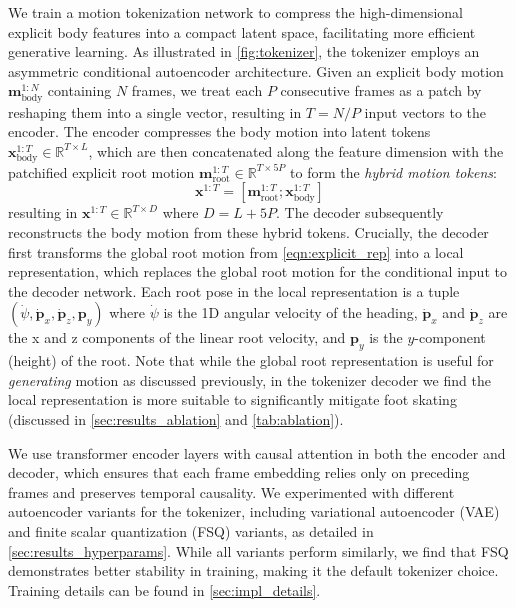 We train a motion tokenization network to compress the high-dimensional explicit body features into a compact latent space, facilitating more efficient generative learning.
As illustrated in \cref{fig:tokenizer}, the tokenizer employs an asymmetric conditional autoencoder architecture.
Given an explicit body motion $\mathbf{m}_\text{body}^{1:N}$ containing $N$ frames, we treat each $P$ consecutive frames as a patch by reshaping them into a single vector, resulting in $T=N/P$ input vectors to the encoder.
The encoder compresses the body motion into latent tokens $\mathbf{x}_\text{body}^{1:T} \in \mathbb{R}^{T \times L}$, which are then concatenated along the feature dimension with the patchified explicit root motion $\mathbf{m}_\text{root}^{1:T} \in \mathbb{R}^{T\times 5P}$ to form the \textit{hybrid motion tokens}:
\begin{equation}
    \mathbf{x}^{1:T} = [ \mathbf{m}_\text{root}^{1:T}; \mathbf{x}_\text{body}^{1:T}  ]
\end{equation}
resulting in $\mathbf{x}^{1:T} \in \mathbb{R}^{T \times D}$ where $D = L + 5P$. 
The decoder subsequently reconstructs the body motion from these hybrid tokens.
Crucially, the decoder first transforms the global root motion from \cref{eqn:explicit_rep} into a local representation, which replaces the global root motion for the conditional input to the decoder network.
Each root pose in the local representation is a tuple $(\dot{\psi}, \dot{\mathbf{p}}_{x}, \dot{\mathbf{p}}_{z}, \mathbf{p}_y)$ where $\dot{\psi}$ is the 1D angular velocity of the heading, $\dot{\mathbf{p}}_{x}$ and $\dot{\mathbf{p}}_{z}$ are the x and z components of the linear root velocity, and $\mathbf{p}_y$ is the $y$-component (height) of the root.
Note that while the global root representation is useful for \textit{generating} motion as discussed previously, in the tokenizer decoder we find the local representation is more suitable to significantly mitigate foot skating (discussed in \cref{sec:results_ablation} and \cref{tab:ablation}).

We use transformer encoder layers with causal attention in both the encoder and decoder, which ensures that each frame embedding relies only on preceding frames and preserves temporal causality.
We experimented with different autoencoder variants for the tokenizer, including variational autoencoder (VAE) \cite{kingma2014auto} and finite scalar quantization (FSQ) \cite{mentzer2023finite} variants, as detailed in \cref{sec:results_hyperparams}. 
While all variants perform similarly, we find that FSQ demonstrates better stability in training, making it the default tokenizer choice. 
Training details can be found in \cref{sec:impl_details}. %

